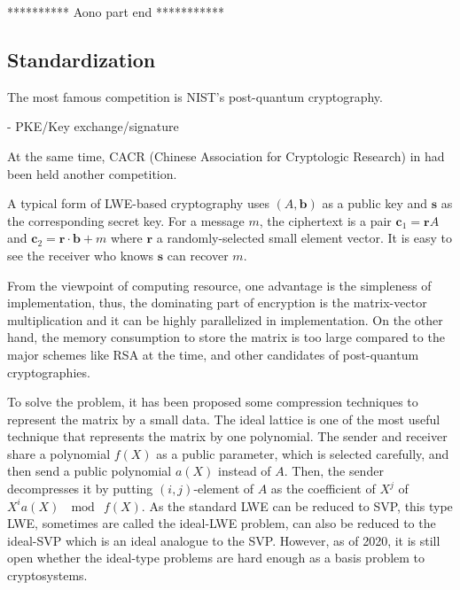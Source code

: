 ********** Aono part end ***********




\subsection{Standardization}

The most famous competition is NIST's post-quantum cryptography.

 - PKE/Key exchange/signature

At the same time, CACR (Chinese Association for Cryptologic Research) in had been held another competition.


\fi




A typical form of LWE-based cryptography uses $(A, \bm{b})$ 
as a public key and $\bm{s}$ as the corresponding secret key. 
For a message $m$, the ciphertext is a pair $\bm{c}_1 = \bm{r}A$ and $\bm{c}_2 = \bm{r} \cdot \bm{b} + m$ where $\bm{r}$ a randomly-selected small element vector.
It is easy to see the receiver who knows $\bm{s}$ can recover $m$.

From the viewpoint of computing resource, one advantage is 
the simpleness of implementation, thus, the dominating part of encryption is the matrix-vector multiplication and it can be highly parallelized in implementation.
On the other hand, the memory consumption to store the matrix is too large compared to the major schemes like RSA at the time, and other candidates of post-quantum cryptographies.

To solve the problem, it has been proposed some compression techniques to represent the matrix by a small data.
The ideal lattice is one of the most useful technique that represents 
the matrix by one polynomial.
The sender and receiver share a polynomial $f(X)$ as a public parameter, which is selected carefully, and then send a public polynomial $a(X)$ instead of $A$.
Then, the sender decompresses it by putting $(i,j)$-element of $A$ as the coefficient of $X^j$ of $X^i a(X)\ \mod\ f(X)$.
As the standard LWE can be reduced to SVP, this type LWE, sometimes are called the ideal-LWE problem, can also be reduced to the ideal-SVP which is an ideal analogue to the SVP.
However, as of 2020, it is still open whether the ideal-type problems are hard enough as a basis problem to cryptosystems.
\fi



